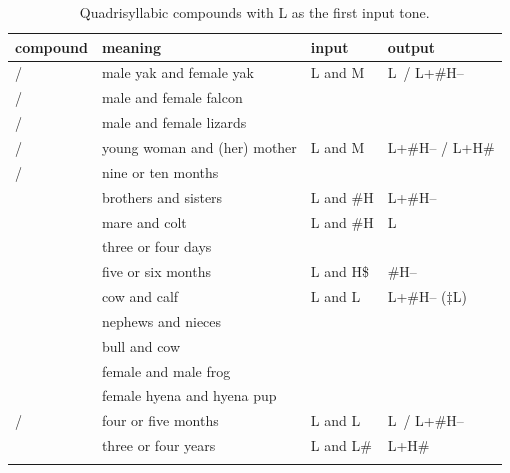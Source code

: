 \begin{subtables}
\begin{table}%
  \caption{Quadrisyllabic compounds with L as the first input tone.}
  \begin{tabularx}{\textwidth}{ P{30mm} Q l l }
    \lsptoprule
  	compound & meaning & input & output\\ \midrule
	 /  & male yak and female yak & L and M & L~/
   L+\#H--\\
    /  & male and female falcon &  &\\
	 /  & male and female lizards &  &\\ \addlinespace \hdashline \addlinespace
    /  & young woman and (her) mother & L and M & L+\#H-- / L+H\#\\
	 /  & nine or ten months &  &\\ \addlinespace \hdashline \addlinespace
	 & brothers and sisters & L and \#H & L+\#H--\\ \addlinespace \hdashline \addlinespace
{} & mare and colt & L and \#H & L\\
	 & three or four days &  &\\ \addlinespace \hdashline \addlinespace
    & five or six months & L and H\$ & \#H--\\ \addlinespace \hdashline \addlinespace
	 & cow and calf & L and L & L+\#H-- ($\ddagger${\kern2pt}L)\\
	 & nephews and nieces &  &\\
	 & bull and cow &  &\\
	 & female and male frog &  &\\
	 & female hyena and hyena pup  &  &\\ \addlinespace \hdashline \addlinespace
	 /  & four or five months & L and L & L~/ L+\#H--\\
	 & three or four years & L and L\# & L+H\#\\
   \lspbottomrule
  \end{tabularx}
\label{tab:examplesofcoordinativeL}
\end{table}



\end{subtables}
